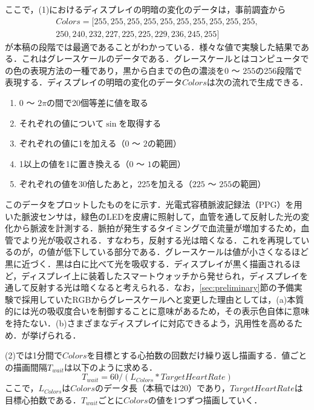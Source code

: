 \documentclass[Japanese,noauthor]{dicomopapers}
\begin{document}
ここで，(1)におけるディスプレイの明暗の変化のデータは，事前調査から
\begin{equation*}
  \begin{split}
    Colors = [255, 255, 255, 255, 255, 255, 255, 255, 255, 255,\\250, 240, 232, 227, 225, 225, 229, 236, 245, 255]
  \end{split}
\end{equation*}
が本稿の段階では最適であることがわかっている．様々な値で実験した結果である．これはグレースケールのデータである．グレースケールとはコンピュータでの色の表現方法の一種であり，黒から白までの色の濃淡を$0$ ～ $255$の256段階で表現する．ディスプレイの明暗の変化のデータ$Colors$は次の流れで生成できる．
\begin{enumerate}
  \renewcommand{\labelenumi}{\arabic{enumi}.}
  \item $0$ ～ $2\pi$の間で20個等差に値を取る
  \item それぞれの値について$\sin$を取得する
  \item ぞれぞれの値に1を加える（$0$ ～ $2$の範囲）
  \item 1以上の値を1に置き換える（$0$ ～ $1$の範囲）
  \item ぞれぞれの値を30倍したあと，225を加える（$225$ ～ $255$の範囲）
\end{enumerate}
このデータをプロットしたものをに示す．光電式容積脈波記録法（PPG）を用いた脈波センサは，緑色のLEDを皮膚に照射して，血管を通して反射した光の変化から脈波を計測する．脈拍が発生するタイミングで血流量が増加するため，血管でより光が吸収される．すなわち，反射する光は暗くなる．これを再現しているのが，の値が低下している部分である．グレースケールは値が小さくなるほど黒に近づく．黒は白に比べて光を吸収する．ディスプレイが黒く描画されるほど，ディスプレイ上に装着したスマートウォッチから発せられ，ディスプレイを通して反射する光は暗くなると考えられる．なお，\ref{sec:preliminary}節の予備実験で採用していたRGBからグレースケールへと変更した理由としては，(a)本質的には光の吸収度合いを制御することに意味があるため，その表示色自体に意味を持たない．(b)さまざまなディスプレイに対応できるよう，汎用性を高めるため．が挙げられる．\par

(2)では1分間で$Colors$を目標とする心拍数の回数だけ繰り返し描画する．値ごとの描画間隔$T_{wait}$は以下のように求める．
\begin{equation}
  \label{eqn:wait}
  T_{wait} = 60 / (L_{Colors} * TargetHeartRate)
\end{equation}
ここで，$L_{Colors}$は$Colors$のデータ長（本稿では20）であり，$TargetHeartRate$は目標心拍数である．$T_{wait}$ごとに$Colors$の値を1つずつ描画していく．
\end{document}
